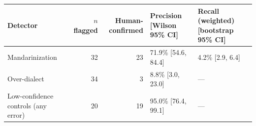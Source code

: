 \begin{tabular}{lrrll}
\toprule
Detector & $n$ flagged & Human-confirmed & Precision [Wilson 95\% CI] & Recall (weighted) [bootstrap 95\% CI] \\
\midrule
Mandarinization & 32 & 23 & 71.9\% [54.6, 84.4] & 4.2\% [2.9, 6.4] \\
Over-dialect & 34 & 3 & 8.8\% [3.0, 23.0] & --- \\
Low-confidence controls (any error) & 20 & 19 & 95.0\% [76.4, 99.1] & --- \\
\bottomrule
\end{tabular}
\par\vspace{2pt}{\small The over-dialect detector is unreliable; its automatic counts are not a result.}
